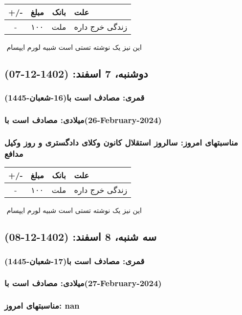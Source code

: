 \documentclass{article}
\newcommand{\rnote}[1]{\marginpar{\textcolor{color}{\StrSubstitute{\##1}{ }{\_}}}}
\newcommand{\myRow}[4]{
    #1 & #2 & #3 & #4 \\ \hline
}
\begin{document}
\begin{tabular}{ | c | c | c | p{5cm} |}
    \hline
    \myRow{ +/- }{مبلغ}{بانک}{علت}
    \myRow{-}{۱۰۰}{ملت}{زندگی خرج داره}
\end{tabular}
\newline
\newline

‌
\rnote{تست}
این نیز یک نوشته تستی است شبیه لورم ایپسام




\newpage
{}
\textcolor{color}{
\section{ دوشنبه، 7 اسفند: (1402-12-07) }
\subsubsection*{قمری: مصادف است با(16-شعبان-1445)} 
\subsubsection*{میلادی: مصادف است با(26-February-2024)}
\subsubsection*{مناسبتهای امروز: سالروز استقلال کانون وکلای دادگستری و روز وکیل مدافع}
}


\begin{tabular}{ | c | c | c | p{5cm} |}
    \hline
    \myRow{ +/- }{مبلغ}{بانک}{علت}
    \myRow{-}{۱۰۰}{ملت}{زندگی خرج داره}
\end{tabular}
\newline
\newline

‌
\rnote{تست}
این نیز یک نوشته تستی است شبیه لورم ایپسام




\newpage
{}
\textcolor{color}{
\section{ سه شنبه، 8 اسفند: (1402-12-08) }
\subsubsection*{قمری: مصادف است با(17-شعبان-1445)} 
\subsubsection*{میلادی: مصادف است با(27-February-2024)}
\subsubsection*{مناسبتهای امروز: nan}
}
\end{document}
